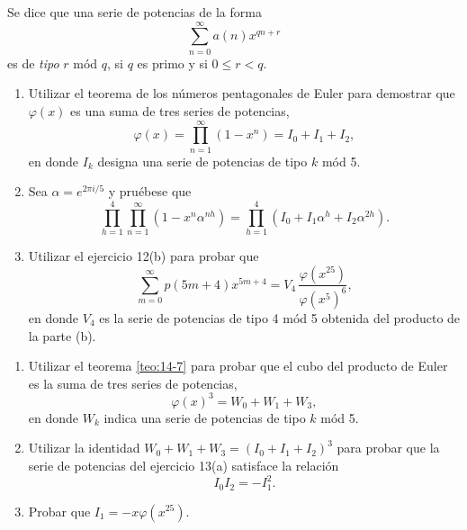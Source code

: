     \begin{ejercicio}
        Se dice que una serie de potencias de la forma
        \begin{equation*}
            \sum_{n=0}^{\infty}a(n)x^{qn+r}
        \end{equation*}
        es de \textit{tipo} $r$ mód $q$, si $q$ es primo y si $0\leq r<q$.
        \begin{enumerate}
            \item[(a)] Utilizar el teorema de los números pentagonales de Euler para demostrar
            que $\varphi(x)$ es una suma de tres series de potencias,
            \begin{equation*}
                \varphi(x)=\prod_{n=1}^{\infty}(1-x^n)=I_0+I_1+I_2,
            \end{equation*}
            en donde $I_k$ designa una serie de potencias de tipo $k$ mód 5.
            \item[(b)] Sea $\alpha=e^{2\pi i/5}$ y pruébese que
            \begin{equation*}
                \prod_{h=1}^{4}\prod_{n=1}^{\infty}(1-x^n\alpha^{nh})=\prod_{h=1}^{4}(I_0+I_1\alpha^h+I_2\alpha^{2h}).
            \end{equation*}
            \item[(c)] Utilizar el ejercicio 12(b) para probar que
            \begin{equation*}
                \sum_{m=0}^{\infty}p(5m+4)x^{5m+4}=V_4\,\frac{\varphi(x^{25})}{\varphi(x^5)^6},
            \end{equation*}
            en donde $V_4$ es la serie de potencias de tipo 4 mód 5 obtenida del producto de la
            parte (b).
        \end{enumerate}
    \end{ejercicio}

    \begin{ejercicio}
        \begin{enumerate}
            \item[(a)] Utilizar el teorema \ref{teo:14-7} para probar que el cubo del producto
            de Euler es la suma de tres series de potencias,
            \begin{equation*}
                \varphi(x)^3=W_0+W_1+W_3,
            \end{equation*}
            en donde $W_k$ indica una serie de potencias de tipo $k$ mód 5.
            \item[(b)] Utilizar la identidad $W_0+W_1+W_3=(I_0+I_1+I_2)^3$ para probar que la
            serie de potencias del ejercicio 13(a) satisface la relación
            \begin{equation*}
                I_0I_2=-I_1^2.
            \end{equation*}
            \item[(c)] Probar que $I_1=-x\varphi(x^{25})$.
        \end{enumerate}
    \end{ejercicio}

